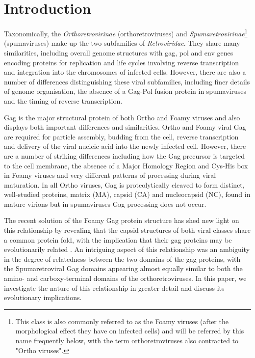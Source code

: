 \section{Introduction}

Taxonomically, the {\em Orthoretrovirinae} (orthoretroviruses) and {\em Spumaretrovirinae}\footnote{
This class is also commonly referred to as the Foamy viruses (after the morphological effect they have on infected cells)
and will be referred by this name frequently below, with the term orthoretroviruses also contracted to "Ortho viruses".
} 
(spumaviruses) make up the two subfamilies of {\em Retroviridae}. They share many similarities, including overall genome
structures with gag, pol and env genes encoding proteins for replication and life cycles involving reverse transcription
and integration into the chromosomes of infected cells. However, there are also a number of differences distinguishing these
viral subfamilies, including finer details of genome organisation, the absence of a Gag-Pol fusion protein in spumaviruses
and the timing of reverse transcription.

Gag is the major structural protein of both Ortho and Foamy viruses and also displays both important differences and similarities.
Ortho and Foamy viral Gag are required for particle assembly, budding from the cell, reverse transcription and delivery of the
viral nucleic acid into the newly infected cell. However, there are a number of striking differences including how the Gag
precursor is targeted to the cell membrane, the absence of a Major Homology Region and Cys-His box in Foamy viruses and very 
different patterns of processing during viral maturation. In all Ortho viruses, Gag is proteolytically cleaved to form distinct, 
well-studied proteins, matrix (MA), capsid (CA) and nucleocapsid (NC), found in mature virions but in spumaviruses Gag processing 
does not occur. 

The recent solution of the Foamy Gag protein structure has shed new light on this relationship by revealing that
the capsid structures of both viral classes share a common protein fold, with the implication that their gag proteins may
be evolutionarily related \cite{BallNJet16}.   An intriguing aspect of this relationship was an ambiguity in the degree of
relatedness between the two domains of the gag proteins, with the Spumaretroviral Gag domains appearing almost equally
similar to both the amino- and carboxy-terminal domains of the orthoretroviruses.   In this paper, we investigate the
nature of this relationship in greater detail and discuss its evolutionary implications. 
